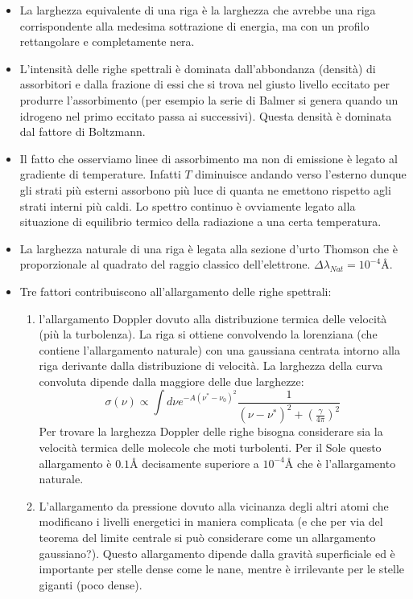 \documentclass[11pt,a4paper]{article}
\begin{document}
\begin{itemize}
\item La larghezza equivalente di una riga è la larghezza che avrebbe una riga corrispondente alla medesima sottrazione di energia, ma con un profilo rettangolare e completamente nera.

\item L'intensità delle righe spettrali è dominata dall'abbondanza (densità) di assorbitori e dalla frazione di essi che si trova nel giusto livello eccitato per produrre l'assorbimento (per esempio la serie di Balmer si genera quando un idrogeno nel primo eccitato passa ai successivi). Questa densità è dominata dal fattore di Boltzmann.

\item Il fatto che osserviamo linee di assorbimento ma non di emissione è legato al gradiente di temperature. Infatti $T$ diminuisce andando verso l'esterno dunque gli strati più esterni assorbono più luce di quanta ne emettono rispetto agli strati interni più caldi. Lo spettro continuo è ovviamente legato alla situazione di equilibrio termico della radiazione a una certa temperatura.

\item La larghezza naturale di una riga è legata alla sezione d'urto Thomson che è proporzionale al quadrato del raggio classico dell'elettrone. $\Delta \lambda_{Nat} = 10^{-4} \si{\angstrom}$.

\item Tre fattori contribuiscono all'allargamento delle righe spettrali:

\begin{enumerate}
\item l'allargamento Doppler dovuto  alla distribuzione termica delle velocità (più la turbolenza).
La riga si ottiene convolvendo la lorenziana (che contiene l'allargamento naturale) con una gaussiana centrata intorno alla riga derivante dalla distribuzione di velocità. La larghezza della curva convoluta dipende dalla maggiore delle due larghezze:
\begin{equation}
\sigma ( \nu ) \propto \int d \nu e^{- A ( \nu^{*} - \nu_0)^2} \frac{1}{(\nu - \nu^{*})^2 + \left( \frac{\gamma}{4 \pi} \right)^2}
\end{equation}
Per trovare la larghezza Doppler delle righe bisogna considerare sia la velocità termica delle molecole che moti turbolenti. Per il Sole questo allargamento è $0.1 \si{\angstrom}$ decisamente superiore a $10^{-4} \si{\angstrom}$ che è l'allargamento naturale.

\item L'allargamento da pressione dovuto alla vicinanza degli altri atomi che modificano i livelli energetici in maniera complicata (e che per via del teorema del limite centrale si può considerare come un allargamento gaussiano?). Questo allargamento dipende dalla gravità superficiale ed è importante per stelle dense come le nane, mentre è irrilevante per le stelle giganti (poco dense).


\end{enumerate}
\end{itemize}
\end{document}
